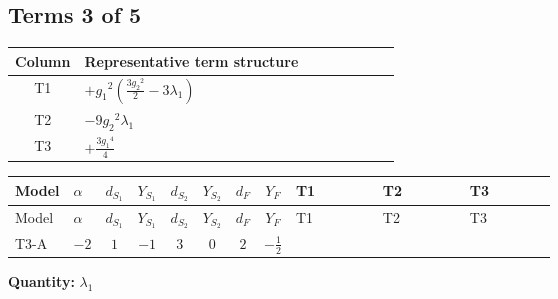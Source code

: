 \documentclass[8pt]{article}
\begin{document}
\begin{landscape}
\subsection*{Terms 3 of 5}
\begin{center}
\begin{tabular}{@{}c >{\raggedright\arraybackslash}p{0.82\linewidth}@{}}
\toprule
Column & Representative term structure \\
\midrule
T1 & \(\displaystyle +{g_1}^2 \left(\frac{3 {g_2}^2}{2}-3 {\lambda_1}\right)\) \\
\midrule
T2 & \(\displaystyle -9 {g_2}^2 {\lambda_1}\) \\
\midrule
T3 & \(\displaystyle +\frac{3 {g_1}^4}{4}\) \\
\midrule
\bottomrule
\end{tabular}
\end{center}
\smallskip
\tiny
\begin{longtable}{@{}llcccccc >{\raggedright\arraybackslash}p{0.21\linewidth} >{\raggedright\arraybackslash}p{0.21\linewidth} >{\raggedright\arraybackslash}p{0.21\linewidth}@{}}
\toprule
Model & $\alpha$ & $d_{S_1}$ & $Y_{S_1}$ & $d_{S_2}$ & $Y_{S_2}$ & $d_F$ & $Y_F$ & T1 & T2 & T3 \\
\midrule
\endfirsthead
\toprule
Model & $\alpha$ & $d_{S_1}$ & $Y_{S_1}$ & $d_{S_2}$ & $Y_{S_2}$ & $d_F$ & $Y_F$ & T1 & T2 & T3 \\
\midrule
\endhead
T3-A & $-2$ & $1$ & $-1$ & $3$ & $0$ & $2$ & $-\frac{1}{2}$ & \scriptsize\adjustbox{max width=\linewidth}{$\begin{gathered} +{g_1}^2 \left(\frac{3 {g_2}^2}{2}-3 {\lambda_1}\right)\end{gathered}$} & \scriptsize\adjustbox{max width=\linewidth}{$\begin{gathered} -9 {g_2}^2 {\lambda_1}\end{gathered}$} & \scriptsize\adjustbox{max width=\linewidth}{$\begin{gathered} +\frac{3 {g_1}^4}{4}\end{gathered}$} \\
\midrule
\bottomrule
\end{longtable}
\clearpage
\noindent\textbf{Quantity: }$\lambda_1$\par\smallskip

\end{landscape}
\end{document}
